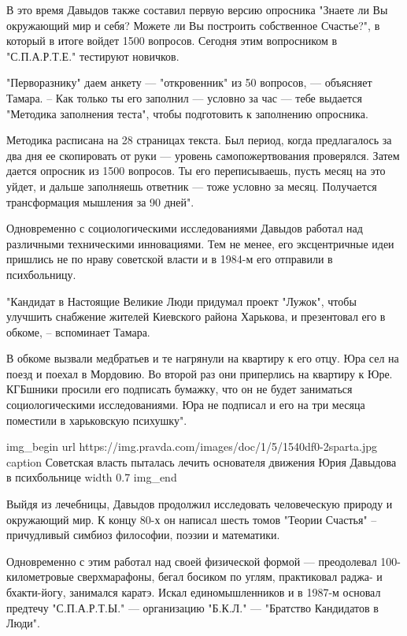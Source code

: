 В это время Давыдов также составил первую версию опросника "Знаете ли Вы
окружающий мир и себя? Можете ли Вы построить собственное Счастье?", в который
в итоге войдет 1500 вопросов. Сегодня этим вопросником в "С.П.А.Р.Т.Е."
тестируют новичков.

"Перворазнику" даем анкету --- "откровенник" из 50 вопросов, --- объясняет Тамара.
– Как только ты его заполнил --- условно за час --- тебе выдается "Методика
заполнения теста", чтобы подготовить к заполнению опросника.

Методика расписана на 28 страницах текста. Был период, когда предлагалось за
два дня ее скопировать от руки --- уровень самопожертвования проверялся. Затем
дается опросник из 1500 вопросов. Ты его переписываешь, пусть месяц на это
уйдет, и дальше заполняешь ответник --- тоже условно за месяц. Получается
трансформация мышления за 90 дней".

Одновременно с социологическими исследованиями Давыдов работал над различными
техническими инновациями. Тем не менее, его эксцентричные идеи пришлись не по
нраву советской власти и в 1984-м его отправили в психбольницу.

"Кандидат в Настоящие Великие Люди придумал проект "Лужок", чтобы улучшить
снабжение жителей Киевского района Харькова, и презентовал его в обкоме, –
вспоминает Тамара. 

В обкоме вызвали медбратьев и те нагрянули на квартиру к его отцу. Юра сел на
поезд и поехал в Мордовию. Во второй раз они приперлись на квартиру к Юре.
КГБшники просили его подписать бумажку, что он не будет заниматься
социологическими исследованиями. Юра не подписал и его на три месяца поместили
в харьковскую психушку".

\ifcmt
img_begin 
	url https://img.pravda.com/images/doc/1/5/1540df0-2sparta.jpg
	caption Советская власть пыталась лечить основателя движения Юрия Давыдова в психбольнице
	width 0.7
img_end
\fi

Выйдя из лечебницы, Давыдов продолжил исследовать человеческую природу и
окружающий мир. К концу 80-х он написал шесть томов "Теории Счастья" –
причудливый симбиоз философии, поэзии и математики. 

Одновременно с этим работал над своей физической формой --- преодолевал
100-километровые сверхмарафоны, бегал босиком по углям, практиковал раджа- и
бхакти-йогу, занимался каратэ. Искал единомышленников и в 1987-м основал
предтечу "С.П.А.Р.Т.Ы." --- организацию "Б.К.Л." --- "Братство Кандидатов в
Люди".

